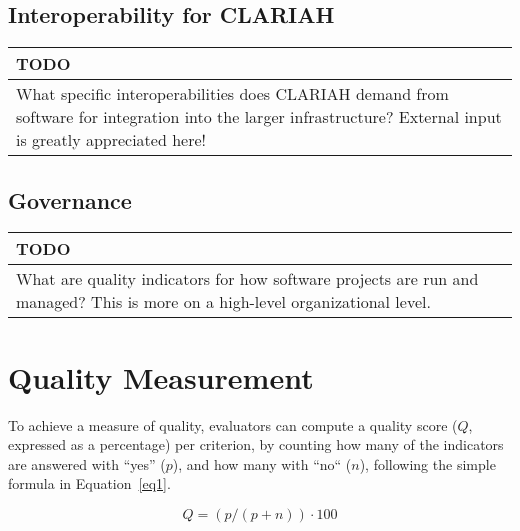 \documentclass[a4paper,11pt]{article}
\newenvironment{TODO}{
\begin{center}
    \begin{tabular}[h!]{|p{0.8\textwidth}|}
    \hline
    {\bf TODO}\\\hline}
{   \\\hline
    \end{tabular}
\end{center}}
\begin{document}
\subsection{Interoperability for CLARIAH}\label{sec:intCLA}


\begin{TODO} 
What specific interoperabilities does CLARIAH demand from software for
integration into the larger infrastructure?  External input is greatly
appreciated here!
\end{TODO}


\subsection{Governance}\label{sec:gov}




\begin{TODO} 
What are quality indicators for how software projects are run and
managed? This is more on a high-level organizational level.
\end{TODO}

\section{Quality Measurement}

To achieve a measure of quality, evaluators can compute a quality score ($Q$,
expressed as a percentage) per criterion, by counting how many of the
indicators are answered with ``yes'' ($p$), and how many with ``no`` ($n$),
following the simple formula in Equation~\ref{eq1}.

\begin{equation}
\label{eq1}
Q = (p / (p + n)) \cdot 100
\end{equation}
\end{document}
